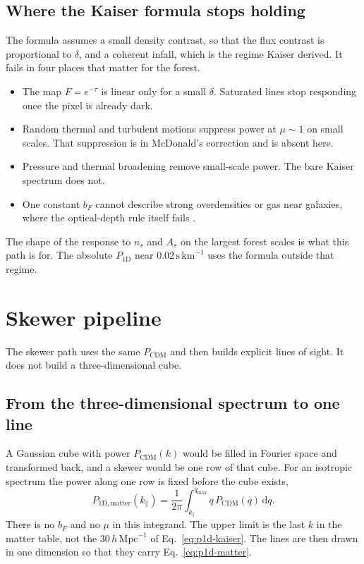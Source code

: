 \documentclass[11pt]{article}
\begin{document}
\subsection{Where the Kaiser formula stops holding}

The formula assumes a small density contrast, so that the flux contrast is proportional to $\delta$, and a coherent infall, which is the regime Kaiser derived. It fails in four places that matter for the forest.
\begin{itemize}
\item The map $F=e^{-\tau}$ is linear only for a small $\delta$. Saturated lines stop responding once the pixel is already dark.
\item Random thermal and turbulent motions suppress power at $\mu\sim 1$ on small scales. That suppression is in McDonald's correction \cite{McDonald:2001fe} and is absent here.
\item Pressure and thermal broadening remove small-scale power. The bare Kaiser spectrum does not.
\item One constant $b_F$ cannot describe strong overdensities or gas near galaxies, where the optical-depth rule itself fails \cite{Kooistra:2022hzw}.
\end{itemize}
The shape of the response to $n_s$ and $A_s$ on the largest forest scales is what this path is for. The absolute $P_{1\mathrm{D}}$ near $0.02\,\mathrm{s\,km}^{-1}$ uses the formula outside that regime.

\section{Skewer pipeline}
\label{sec:skewers}

The skewer path uses the same $P_\mathrm{CDM}$ and then builds explicit lines of sight. It does not build a three-dimensional cube.

\subsection{From the three-dimensional spectrum to one line}

A Gaussian cube with power $P_\mathrm{CDM}(k)$ would be filled in Fourier space and transformed back, and a skewer would be one row of that cube. For an isotropic spectrum the power along one row is fixed before the cube exists,
\begin{equation}
\label{eq:p1d-matter}
P_{1\mathrm{D},\mathrm{matter}}(k_\parallel)
=
\frac{1}{2\pi}
\int_{k_\parallel}^{q_\mathrm{max}}
q\,P_\mathrm{CDM}(q)\,\mathrm{d}q.
\end{equation}
There is no $b_F$ and no $\mu$ in this integrand. The upper limit is the last $k$ in the matter table, not the $30\,h\,\mathrm{Mpc}^{-1}$ of Eq.~\eqref{eq:p1d-kaiser}. The lines are then drawn in one dimension so that they carry Eq.~\eqref{eq:p1d-matter}.
\end{document}
